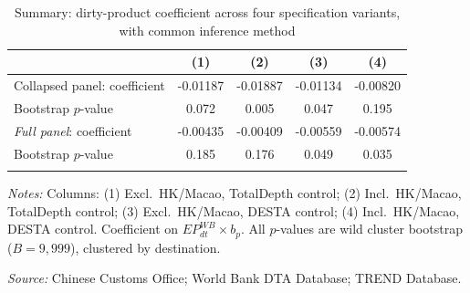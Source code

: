 \begin{table}[htbp]
\centering
\footnotesize
\caption{Summary: dirty-product coefficient across four specification variants, with common inference method}
\label{tab:matrice}
\begin{threeparttable}
\begin{tabular}{lcccc}
\toprule
 & (1) & (2) & (3) & (4) \\
\midrule
Collapsed panel: coefficient & -0.01187 & -0.01887 & -0.01134 & -0.00820 \\
\quad Bootstrap $p$-value & 0.072 & 0.005 & 0.047 & 0.195 \\
\addlinespace
\emph{Full panel}: coefficient & -0.00435 & -0.00409 & -0.00559 & -0.00574 \\
\quad Bootstrap $p$-value & 0.185 & 0.176 & 0.049 & 0.035 \\
\addlinespace
\bottomrule
\end{tabular}
\begin{tablenotes}[flushleft]\footnotesize
\item \emph{Notes:} Columns: (1) Excl.\ HK/Macao, TotalDepth control; (2) Incl.\ HK/Macao, TotalDepth control; (3) Excl.\ HK/Macao, DESTA control; (4) Incl.\ HK/Macao, DESTA control. Coefficient on $EP^{WB}_{dt} \times b_p$. All $p$-values are wild cluster bootstrap ($B = 9{,}999$), clustered by destination.
\item \textit{Source:} Chinese Customs Office; World Bank DTA Database; TREND Database.
\end{tablenotes}
\end{threeparttable}
\end{table}
